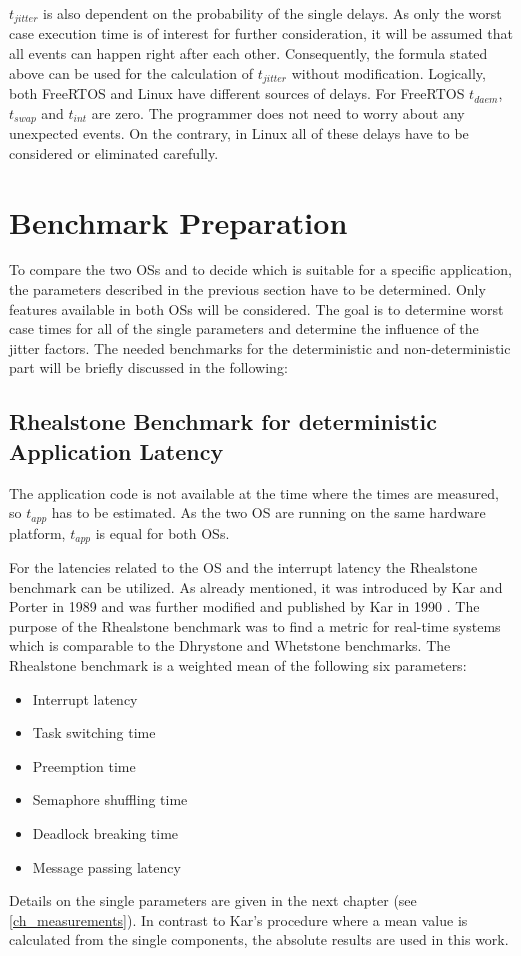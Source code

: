 $ t_{jitter} $ is also dependent on the probability of the single delays.
As only the worst case execution time is of interest for further consideration, it will be assumed that all events can happen right after each other.
Consequently, the formula stated above can be used for the calculation of $ t_{jitter} $ without modification.    
Logically, both FreeRTOS and Linux have different sources of delays. 
For FreeRTOS $ t_{daem} $, $ t_{swap} $ and $ t_{int} $ are zero. 
The programmer does not need to worry about any unexpected events.
On the contrary, in Linux all of these delays have to be considered or eliminated carefully.

\section{Benchmark Preparation}
To compare the two \acp{OS} and to decide which is suitable for a specific application, the parameters described in the previous section have to be determined.
Only features available in both \acp{OS} will be considered.
The goal is to determine worst case times for all of the single parameters and determine the influence of the jitter factors.
The needed benchmarks for the deterministic and non-deterministic part will be briefly discussed in the following:
\subsection{Rhealstone Benchmark for deterministic Application Latency} \label{ss_rhealstone_benchmark_for_deterministic_application_latency}
The application code is not available at the time where the times are measured, so $ t_{app} $ has to be estimated. As the two \ac{OS} are running on the same hardware platform, $ t_{app} $ is equal for both \acp{OS}.
\par
For the latencies related to the \ac{OS} and the interrupt latency the Rhealstone benchmark can be utilized. 
As already mentioned, it was introduced by Kar and Porter in 1989 \cite{kar:artbp} and was further modified and published by Kar in 1990 \cite{kar:itrb}.
The purpose of the Rhealstone benchmark was to find a metric for real-time systems which is comparable to the Dhrystone \cite{weicker:dasspb} and Whetstone \cite{wichmann:asb} benchmarks.
The Rhealstone benchmark is a weighted mean of the following six parameters:
\begin{itemize}
	\item Interrupt latency
	\item Task switching time
	\item Preemption time
	\item Semaphore shuffling time
	\item Deadlock breaking time
	\item Message passing latency
\end{itemize}
Details on the single parameters are given in the next chapter (see \ref{ch_measurements}).
In contrast to Kar's procedure where a mean value is calculated from the single components, the absolute results are used in this work. 

